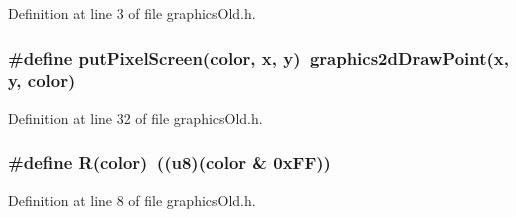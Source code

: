Definition at line 3 of file graphics\-Old.h.
\subsubsection{\setlength{\rightskip}{0pt plus 5cm}\#define put\-Pixel\-Screen(color, x, y)~graphics2d\-Draw\-Point(x, y, color)}\label{graphicsOld_8h_a9ec52e7249b94d1dd010006f2443cd1}




Definition at line 32 of file graphics\-Old.h.
\subsubsection{\setlength{\rightskip}{0pt plus 5cm}\#define R(color)~((u8)(color \& 0x\-FF))}\label{graphicsOld_8h_de8726343ca32cab0df4d619b18bf083}




Definition at line 8 of file graphics\-Old.h.